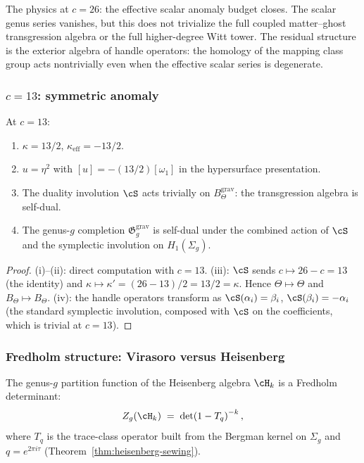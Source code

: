 The physics at $c = 26$: the effective scalar anomaly budget
closes. The scalar genus series vanishes, but this does not
trivialize the full coupled matter--ghost transgression algebra or
the full higher-degree Witt tower. The residual
structure is the exterior algebra of handle operators: the
homology of the mapping class group acts nontrivially even when the
effective scalar series is degenerate.

\subsubsection*{$c = 13$: symmetric anomaly}

\begin{proposition}[Self-dual anomaly at $c = 13$;
\ClaimStatusProvedHere]
\label{prop:gravity-c13-anomaly}
At $c = 13$:
\begin{enumerate}[label=\textup{(\roman*)}]
\item $\kappa = 13/2$, $\kappa_{\mathrm{eff}} = -13/2$.
\item $u = \eta^2$ with
 $[u] = -(13/2)[\omega_1]$ in the hypersurface
 presentation.
\item The duality involution $\cS$ acts trivially on
 $B_\Theta^{\mathrm{grav}}$: the transgression algebra is
 self-dual.
\item The genus-$g$ completion $\mathfrak{G}_g^{\mathrm{grav}}$
 is self-dual under the combined action of $\cS$ and the
 symplectic involution on $H_1(\Sigma_g)$.
\end{enumerate}
\end{proposition}

\begin{proof}
(i)--(ii): direct computation with $c = 13$.
(iii): $\cS$ sends $c \mapsto 26-c = 13$ (the identity) and
$\kappa \mapsto \kappa' = (26-13)/2 = 13/2 = \kappa$.
Hence $\Theta \mapsto \Theta$ and
$B_\Theta \mapsto B_\Theta$.
(iv): the handle operators transform as
$\cS(\alpha_i) = \beta_i$, $\cS(\beta_i) = -\alpha_i$
(the standard symplectic involution, composed with $\cS$ on the
coefficients, which is trivial at $c = 13$).
\end{proof}

\subsubsection*{Fredholm structure: Virasoro versus Heisenberg}

\begin{theorem}
\label{thm:gravity-heisenberg-fredholm}
The genus-$g$ partition function of the Heisenberg algebra
$\cH_k$ is a Fredholm determinant:
\begin{equation}\label{eq:thqg-heisenberg-fredholm}
Z_g(\cH_k)
\;=\;
\det\!\left(1 - T_q\right)^{-k},
\end{equation}
where $T_q$ is the trace-class operator built from the Bergman
kernel on $\Sigma_g$ and $q = e^{2\pi i\tau}$
\textup{(}Theorem~\textup{\ref{thm:heisenberg-sewing}}\textup{)}.
\end{theorem}

